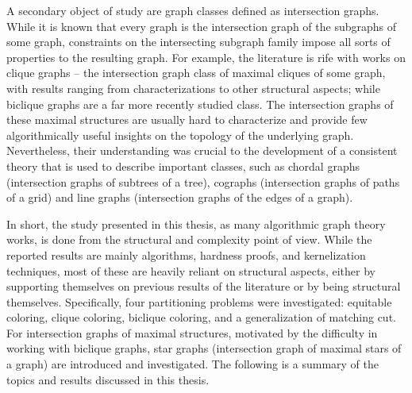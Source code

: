 A secondary object of study are graph classes defined as intersection graphs.
While it is known that every graph is the intersection graph of the subgraphs of some graph, constraints on the intersecting subgraph family impose all sorts of properties to the resulting graph.
For example, the literature is rife with works on clique graphs -- the intersection graph class of maximal cliques of some graph, with results ranging from characterizations to other structural aspects; while biclique graphs are a far more recently studied class.
The intersection graphs of these maximal structures are usually hard to characterize and provide few algorithmically useful insights on the topology of the underlying graph.
Nevertheless, their understanding was crucial to the development of a consistent theory that is used to describe important classes, such as chordal graphs (intersection graphs of subtrees of a tree), cographs (intersection graphs of paths of a grid) and line graphs (intersection graphs of the edges of a graph).

In short, the study presented in this thesis, as many algorithmic graph theory works, is done from the structural and complexity point of view.
While the reported results are mainly algorithms, hardness proofs, and kernelization techniques, most of these are heavily reliant on structural aspects, either by supporting themselves on previous results of the literature or by being structural themselves.
Specifically, four partitioning problems were investigated: equitable coloring, clique coloring, biclique coloring, and a generalization of matching cut.
For intersection graphs of maximal structures, motivated by the difficulty in working with biclique graphs, star graphs (intersection graph of maximal stars of a graph) are introduced and investigated.
The following is a summary of the topics and results discussed in this thesis.

